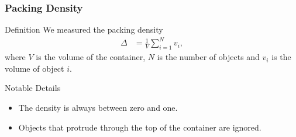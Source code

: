 \documentclass[sumlimits, intlimits]{beamer}
\begin{document}
\begin{frame}
%
\end{frame}

\begin{frame}
\frametitle{Packing Density}
\begin{block}{Definition}
We measured the packing density
\begin{align*}
\Delta & = \frac 1 V \sum_{i = 1}^N v_i,
\end{align*}
where $V$ is the volume of the container,
$N$ is the number of objects and
$v_i$ is the volume of object $i$.
\end{block}
\begin{block}{Notable Details}
\begin{itemize}
\item The density is always between zero and one.
\item Objects that protrude through the top of the container are ignored.
\end{itemize}
\end{block}
\end{frame}
\end{document}
